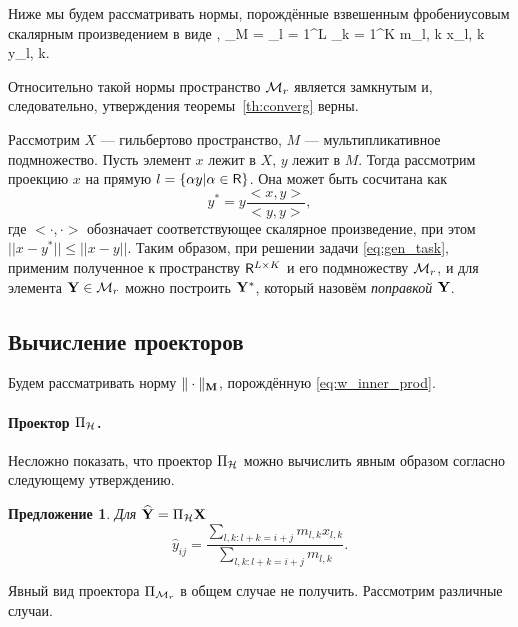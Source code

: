 \documentclass[12pt,a4paper,fleqn,leqno]{article}
\newtheorem{proposition}{Предложение}%
\begin{document}
Ниже мы будем рассматривать нормы, порождённые взвешенным фробениусовым скалярным произведением в виде
\be
\label{eq:w_inner_prod}
\langle\bfX, \bfY\rangle_M = \sum_{l = 1}^L \sum_{k = 1}^K m_{l, k} x_{l, k} y_{l, k}.
\ee

Относительно такой нормы пространство $\mathcal{M}_r$ является замкнутым и, следовательно, утверждения теоремы~\ref{th:converg} верны.

Рассмотрим $X$ --- гильбертово пространство, $M$ --- мультипликативное подмножество. Пусть элемент $x$ лежит в $X$, $y$ лежит в $M$. Тогда рассмотрим проекцию $x$ на прямую $l = \{\alpha y | \alpha \in \mathsf{R}\}$. Она может быть сосчитана как
\begin{equation*}
y^* = y \frac{<x, y>}{<y, y>},
\end{equation*}
где $<\cdot, \cdot>$ обозначает соответствующее скалярное произведение, при этом $||x - y^*|| \le ||x - y||$. Таким образом, при решении задачи \eqref{eq:gen_task}, применим полученное к пространству $\mathsf{R}^{L \times K}$ и его подмножеству $\mathcal{M}_r$, и для элемента $\mathbf{Y} \in \mathcal{M}_r$ можно построить $\mathbf{Y}^*$, который назовём \emph{поправкой $\mathbf{Y}$}.


\subsection{Вычисление проекторов}

Будем рассматривать норму $\|\cdot\|_{\mathbf{M}}$, порождённую \eqref{eq:w_inner_prod}.

\paragraph{Проектор $\Pi_{\mathcal{H}}$.} Несложно показать, что проектор $\Pi_{\mathcal{H}}$
можно вычислить явным образом согласно следующему утверждению.

\begin{proposition}
Для $\widehat{\mathbf{Y}}=\Pi_{\mathcal{H}} \mathbf{X}$
\begin{equation*}
\hat{y}_{ij} = \frac{\sum_{l,k: l+k=i+j} m_{l,k} x_{l,k}}{\sum_{l,k: l+k=i+j} m_{l,k}}.
\end{equation*}
\end{proposition}

Явный вид проектора $\Pi_{\mathcal{M}_r}$ в общем случае не получить.
Рассмотрим различные случаи.
\end{document}
